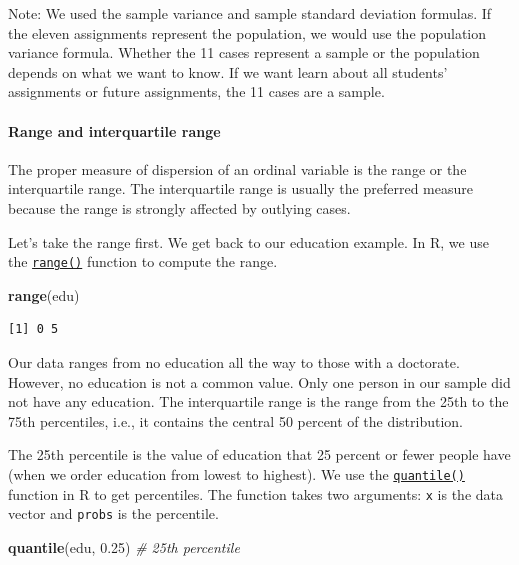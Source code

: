 \documentclass[]{article}
\newenvironment{Shaded}{\begin{snugshade}}{\end{snugshade}}
\newcommand{\CommentTok}[1]{\textcolor[rgb]{0.56,0.35,0.01}{\textit{#1}}}
\newcommand{\FloatTok}[1]{\textcolor[rgb]{0.00,0.00,0.81}{#1}}
\newcommand{\KeywordTok}[1]{\textcolor[rgb]{0.13,0.29,0.53}{\textbf{#1}}}
\newcommand{\NormalTok}[1]{#1}
\let\oldparagraph\paragraph
\renewcommand{\paragraph}[1]{\oldparagraph{#1}\mbox{}}
\begin{document}
Note: We used the sample variance and sample standard deviation formulas. If the eleven assignments represent the population, we would use the population variance formula. Whether the 11 cases represent a sample or the population depends on what we want to know. If we want learn about all students' assignments or future assignments, the 11 cases are a sample.

\hypertarget{range-and-interquartile-range}{%
\paragraph{Range and interquartile range}\label{range-and-interquartile-range}}

The proper measure of dispersion of an ordinal variable is the range or the interquartile range. The interquartile range is usually the preferred measure because the range is strongly affected by outlying cases.

Let's take the range first. We get back to our education example. In R, we use the \href{http://bit.ly/R_range}{\texttt{range()}} function to compute the range.

\begin{Shaded}
\begin{Highlighting}[]
\KeywordTok{range}\NormalTok{(edu)}
\end{Highlighting}
\end{Shaded}

\begin{verbatim}
[1] 0 5
\end{verbatim}

Our data ranges from no education all the way to those with a doctorate. However, no education is not a common value. Only one person in our sample did not have any education. The interquartile range is the range from the 25th to the 75th percentiles, i.e., it contains the central 50 percent of the distribution.

The 25th percentile is the value of education that 25 percent or fewer people have (when we order education from lowest to highest). We use the \href{http://bit.ly/R_quantile}{\texttt{quantile()}} function in R to get percentiles. The function takes two arguments: \texttt{x} is the data vector and \texttt{probs} is the percentile.

\begin{Shaded}
\begin{Highlighting}[]
\KeywordTok{quantile}\NormalTok{(edu, }\FloatTok{0.25}\NormalTok{) }\CommentTok{# 25th percentile}
\end{Highlighting}
\end{Shaded}
\end{document}
